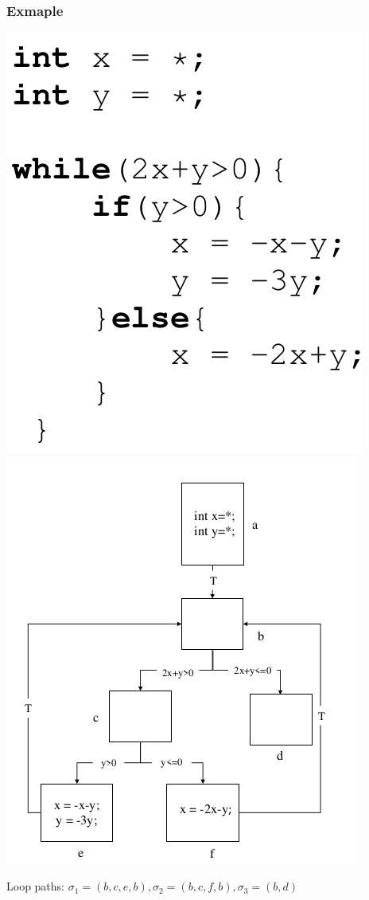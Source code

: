\documentclass[11pt]{beamer}
\begin{document}
\begin{frame}\frametitle{Exmaple}
\begin{center}
\includegraphics[scale=0.25]{1code.png}
\includegraphics[scale=0.37]{1cfg.png}
\end{center}

Loop paths: $\sigma_1 = (b,c,e,b), \sigma_2 = (b,c,f,b), \sigma_3 = (b,d)$
\end{frame}
\end{document}
